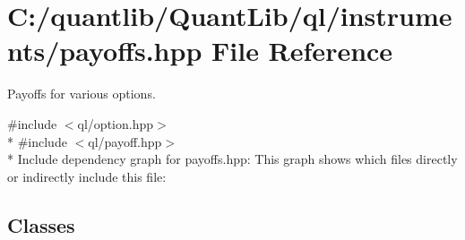\section{C\+:/quantlib/\+Quant\+Lib/ql/instruments/payoffs.hpp File Reference}
\label{payoffs_8hpp}


Payoffs for various options.  


{\ttfamily \#include $<$ql/option.\+hpp$>$}\\*
{\ttfamily \#include $<$ql/payoff.\+hpp$>$}\\*
Include dependency graph for payoffs.\+hpp\+:
This graph shows which files directly or indirectly include this file\+:
\subsection*{Classes}
